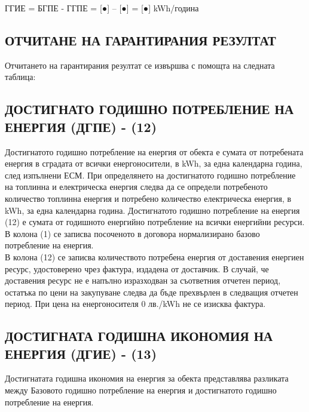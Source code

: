 ГГИЕ = БГПЕ - ГГПЕ = [●] – [●] = [●] kWh/година

\subsection{ОТЧИТАНЕ НА ГАРАНТИРАНИЯ РЕЗУЛТАТ}
Отчитането на гарантирания резултат се извършва с помощта на следната
таблица:


\begin{center}
\end{center}

\subsection{ДОСТИГНАТО ГОДИШНО ПОТРЕБЛЕНИЕ НА ЕНЕРГИЯ (ДГПЕ) {-} (12)}
Достигнатото годишно потребление на енергия от обекта е сумата от
потребената енергия в сградата от всички енергоносители, в kWh, за
една календарна година, след изпълнени ЕСМ.  При определянето на
достигнатото годишно потребление на топлинна и електрическа енергия
следва да се определи потребеното количество топлинна енергия и
потребено количество електрическа енергия, в kWh, за една календарна
година. Достигнатото годишно потребление на енергия (12) е сумата от
годишното енергийно потребление на всички енергийни ресурси.\\  В колона
(1) се записва посоченото в договора нормализирано базово потребление
на енергия.\\  В колона (12) се записва количеството потребена енергия
от доставения енергиен ресурс, удостоверено чрез фактура, издадена от
доставчик. В случай, че доставения ресурс не е напълно изразходван за
съответния отчетен период, остатъка по цени на закупуване следва да
бъде прехвърлен в следващия отчетен период. При цена на енергоносителя
0 лв./kWh не се изисква фактура.

\subsection{ДОСТИГНАТА ГОДИШНА ИКОНОМИЯ НА ЕНЕРГИЯ (ДГИЕ) {-} (13)}
Достигнатата годишна икономия на енергия за обекта представлява
разликата между Базовото годишно потребление на енергия и достигнатото
годишно потребление на енергия.

